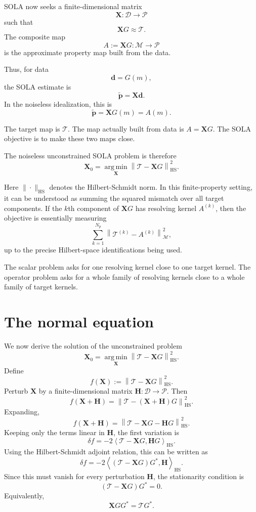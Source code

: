 \documentclass[11pt,openany]{book}
\theoremstyle{definition}
\theoremstyle{remark}
\newcommand{\M}{\mathcal M}
\newcommand{\D}{\mathcal D}
\newcommand{\Pspace}{\mathcal P}
\newcommand{\Tau}{\mathcal{T}}
\newcommand{\HS}{\mathrm{HS}}
\newcommand{\argmin}{\operatorname*{arg\,min}}
\begin{document}
SOLA now seeks a finite-dimensional matrix
\[
  \mathbf X:\D\to\Pspace
\]
such that
\[
  \mathbf XG\approx \Tau.
\]
The composite map
\[
  A:=\mathbf XG:\M\to\Pspace
\]
is the approximate property map built from the data.

Thus, for data
\[
  \mathbf d=G(m),
\]
the SOLA estimate is
\[
  \widetilde{\mathbf p}
  =
  \mathbf X\mathbf d.
\]
In the noiseless idealization, this is
\[
  \widetilde{\mathbf p}
  =
  \mathbf XG(m)
  =
  A(m).
\]

The target map is \(\Tau\). The map actually built from data is \(A=\mathbf XG\). The SOLA
objective is to make these two maps close.

The noiseless unconstrained SOLA problem is therefore
\[
  \mathbf X_0
  =
  \argmin_{\mathbf X}
  \left\|
    \Tau-\mathbf XG
  \right\|_{\HS}^2.
\]

Here \(\|\cdot\|_{\HS}\) denotes the Hilbert-Schmidt norm. In this finite-property setting, it can
be understood as summing the squared mismatch over all target components. If the \(k\)th
component of \(\mathbf XG\) has resolving kernel \(A^{(k)}\), then the objective is essentially
measuring
\[
  \sum_{k=1}^{N_p}
  \left\|
    \Tau^{(k)}-A^{(k)}
  \right\|_{\M}^2,
\]
up to the precise Hilbert-space identifications being used.

\begin{checkpointbox}
The scalar problem asks for one resolving kernel close to one target kernel. The operator problem
asks for a whole family of resolving kernels close to a whole family of target kernels.
\end{checkpointbox}

\section{The normal equation}

We now derive the solution of the unconstrained problem
\[
  \mathbf X_0
  =
  \argmin_{\mathbf X}
  \left\|
    \Tau-\mathbf XG
  \right\|_{\HS}^2.
\]
Define
\[
  f(\mathbf X)
  :=
  \left\|
    \Tau-\mathbf XG
  \right\|_{\HS}^2.
\]
Perturb \(\mathbf X\) by a finite-dimensional matrix \(\mathbf H:\D\to\Pspace\). Then
\[
  f(\mathbf X+\mathbf H)
  =
  \left\|
    \Tau-(\mathbf X+\mathbf H)G
  \right\|_{\HS}^2.
\]
Expanding,
\[
  f(\mathbf X+\mathbf H)
  =
  \left\|
    \Tau-\mathbf XG-\mathbf HG
  \right\|_{\HS}^2.
\]
Keeping only the terms linear in \(\mathbf H\), the first variation is
\[
  \delta f
  =
  -2
  \left\langle
    \Tau-\mathbf XG,
    \mathbf HG
  \right\rangle_{\HS}.
\]
Using the Hilbert-Schmidt adjoint relation, this can be written as
\[
  \delta f
  =
  -2
  \left\langle
    (\Tau-\mathbf XG)G^*,
    \mathbf H
  \right\rangle_{\HS}.
\]
Since this must vanish for every perturbation \(\mathbf H\), the stationarity condition is
\[
  (\Tau-\mathbf XG)G^*=0.
\]
Equivalently,
\[
  \mathbf XGG^*=\Tau G^*.
\]
\end{document}
